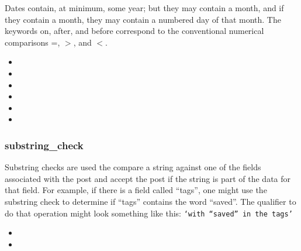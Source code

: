 Dates contain, at minimum, some year; but they may contain a month, and if they contain a month, they may contain a numbered day of
that month. The keywords on, after, and before correspond to the conventional numerical comparisons =, $>$, and $<$.
\begin{itemize}[leftmargin=2in]
    \item[\nonterminal{qualifier}] \bnf{:} 
    \item[\nonterminal{date\_check}] \bnf{:}  \bnf{(} \bnf{|}  \bnf{|} \bnf{)}
    \item[\nonterminal{date}] \bnf{:} \bnf{(}     
    \item[\nonterminal{year}] \bnf{:} 
    \item[\nonterminal{month}] \bnf{:}  \bnf{|}  \bnf{|}  \bnf{|}  \bnf{|}  \bnf{|}  \bnf{|}  \bnf{|}  \bnf{|}  \bnf{|}  \bnf{|}  \bnf{|} 
    \item[\nonterminal{day}] \bnf{:} \bnf{[0-3]} 
\end{itemize}

\subsubsection{substring\_check}
Substring checks are used the compare a string against one of the fields associated with the post and accept the post if the string is part
of the data for that field. For example, if there is a field called “tags”, one might use the substring check to determine if “tags”
contains the word “saved”. The qualifier to do that operation might look something like this: \texttt{‘with “saved” in the tags’}
\begin{itemize}[leftmargin=2in]
    \item[\nonterminal{qualifier}] \bnf{:} 
    \item[\nonterminal{substring\_check}] \bnf{:} 
\end{itemize}

